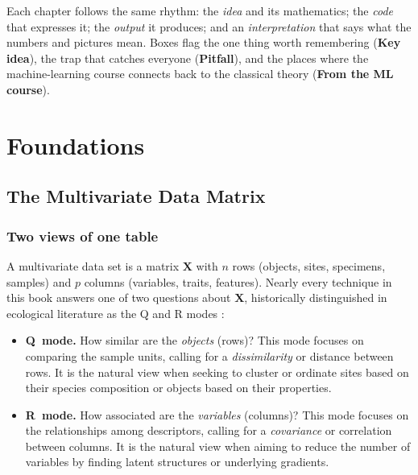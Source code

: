 \documentclass[11pt,oneside]{book}
\begin{document}
Each chapter follows the same rhythm: the \emph{idea} and its mathematics; the \emph{code}
that expresses it; the \emph{output} it produces; and an \emph{interpretation} that says
what the numbers and pictures mean. Boxes flag the one thing worth remembering
(\textcolor{wnavy}{\textbf{Key idea}}), the trap that catches everyone
(\textcolor{wwine}{\textbf{Pitfall}}), and the places where the machine-learning course
connects back to the classical theory (\textcolor{wteal}{\textbf{From the ML course}}).


\mainmatter

\part{Foundations}
\label{part:found}

\chapter{The Multivariate Data Matrix}
\label{ch:matrix}
\section{Two views of one table}
A multivariate data set is a matrix $\mathbf{X}$ with $n$ rows (objects, sites,
specimens, samples) and $p$ columns (variables, traits, features). Nearly every
technique in this book answers one of two questions about $\mathbf{X}$, historically distinguished in ecological literature as the Q and R modes \cite{Legendre_2012}:

\begin{itemize}[leftmargin=1.4em]
  \item \textbf{Q~mode.} How similar are the \emph{objects} (rows)? This mode focuses on comparing the sample units, calling for a \emph{dissimilarity} or distance between rows. It is the natural view when seeking to cluster or ordinate sites based on their species composition or objects based on their properties.
  \item \textbf{R~mode.} How associated are the \emph{variables} (columns)? This mode focuses on the relationships among descriptors, calling for a \emph{covariance} or correlation between columns. It is the natural view when aiming to reduce the number of variables by finding latent structures or underlying gradients.
\end{itemize}
\end{document}
